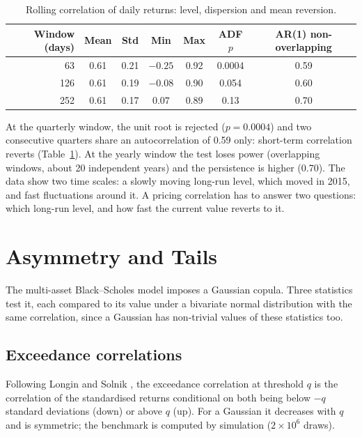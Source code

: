 \documentclass[11pt,a4paper]{article}
\begin{document}
\begin{table}[h]
\centering
\begin{tabular}{@{}rcccccc@{}}
\toprule
Window (days) & Mean & Std & Min & Max & ADF $p$ & AR(1) non-overlapping \\
\midrule
63  & 0.61 & 0.21 & $-0.25$ & 0.92 & 0.0004 & 0.59 \\
126 & 0.61 & 0.19 & $-0.08$ & 0.90 & 0.054  & 0.60 \\
252 & 0.61 & 0.17 & $0.07$  & 0.89 & 0.13   & 0.70 \\
\bottomrule
\end{tabular}
\caption{Rolling correlation of daily returns: level, dispersion and mean reversion.}
\label{tab:reversion}
\end{table}

At the quarterly window, the unit root is rejected ($p = 0.0004$) and two consecutive quarters share an
autocorrelation of 0.59 only: short-term correlation reverts (Table~\ref{tab:reversion}). At the yearly window the
test loses power (overlapping windows, about 20 independent years) and the persistence is higher (0.70). The data
show two time scales: a slowly moving long-run level, which moved in 2015, and fast fluctuations around it. A pricing
correlation has to answer two questions: which long-run level, and how fast the current value reverts to it.

\section{Asymmetry and Tails}\label{sec:tails}
The multi-asset Black--Scholes model imposes a Gaussian copula. Three statistics test it, each compared to its value
under a bivariate normal distribution with the same correlation, since a Gaussian has non-trivial values of these
statistics too.

\subsection{Exceedance correlations}
Following Longin and Solnik \cite{longinsolnik2001}, the exceedance correlation at threshold $q$ is the correlation of
the standardised returns conditional on both being below $-q$ standard deviations (down) or above $q$ (up). For a
Gaussian it decreases with $q$ and is symmetric; the benchmark is computed by simulation ($2\times10^6$ draws).
\end{document}
